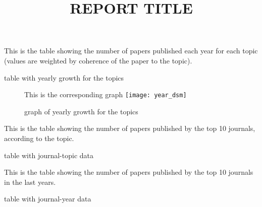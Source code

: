 \documentclass{article}
\begin{document}
	
	\title{REPORT TITLE}
	\maketitle
	
	\begin{table}[!htpb]
		This is the table showing the number of papers published each year for each topic (values are weighted by coherence of the paper to the topic).
		\centering
		\caption{table with yearly growth for the topics}
	\end{table}
	
	
	\begin{figure}[t]
		This is the corresponding graph
		\centering
		\texttt{[image: year\_dsm]}
		\caption{graph of yearly growth for the topics}
	\end{figure}
	
	\begin{table}[b]
		This is the table showing the number of papers published by the top 10 journals, according to the topic.
		\centering
		{}%
		{\csvlinetotablerow}
		\caption{table with journal-topic data}
	\end{table}

	\begin{table}[t]
		This is the table showing the number of papers published by the top 10 journals in the last years.
		\centering
		{}%
		{\csvlinetotablerow}
		\caption{table with journal-year data}
	\end{table}
\end{document}
